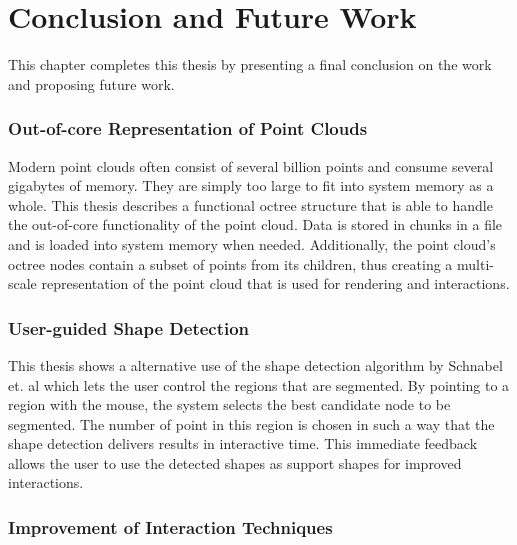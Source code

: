 \chapter{Conclusion and Future Work}
\label{chap:conclusion}


This chapter completes this thesis by presenting a final conclusion on the work and proposing future work.

\subsection{Out-of-core Representation of Point Clouds}

Modern point clouds often consist of several billion points and consume several gigabytes of memory. They are simply too large to fit into system memory as a whole. This thesis describes a functional octree structure that is able to handle the out-of-core functionality of the point cloud. Data is stored in chunks in a file and is loaded into system memory when needed. Additionally, the point cloud's octree nodes contain a subset of points from its children, thus creating a multi-scale representation of the point cloud that is used for rendering and interactions. 


\subsection{User-guided Shape Detection}

This thesis shows a alternative use of the shape detection algorithm by Schnabel et. al\cite{schnabel-2007-efficient} which lets the user control the regions that are segmented. By pointing to a region with the mouse, the system selects the best candidate node to be segmented. The number of point in this region is chosen in such a way that the shape detection delivers results in interactive time. This immediate feedback allows the user to use the detected shapes as support shapes for improved interactions. 


\subsection{Improvement of Interaction Techniques}

